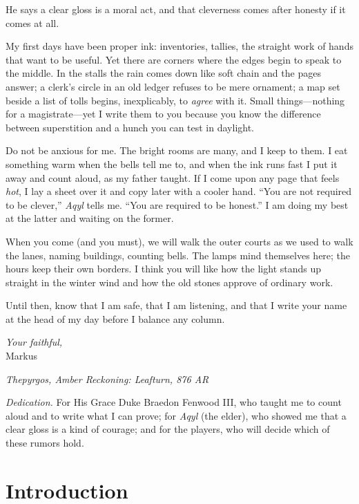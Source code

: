 \documentclass[11pt]{article}
\numberwithin{equation}{section} %
\theoremstyle{plain} %
\theoremstyle{definition} %
\theoremstyle{remark} %
\begin{document}
He says a clear gloss is a moral act, and that cleverness comes after honesty if it comes at all.

\medskip
My first days have been proper ink: inventories, tallies, the straight work of hands that want to be useful. Yet there are corners where the edges begin to speak to the middle. In the stalls the rain comes down like soft chain and the pages answer; a clerk’s circle in an old ledger refuses to be mere ornament; a map set beside a list of tolls begins, inexplicably, to \emph{agree} with it. Small things—nothing for a magistrate—yet I write them to you because you know the difference between superstition and a hunch you can test in daylight.

Do not be anxious for me. The bright rooms are many, and I keep to them. I eat something warm when the bells tell me to, and when the ink runs fast I put it away and count aloud, as my father taught. If I come upon any page that feels \emph{hot}, I lay a sheet over it and copy later with a cooler hand. “You are not required to be clever,” \textit{Aqyl} tells me. “You are required to be honest.” I am doing my best at the latter and waiting on the former.

\medskip
When you come (and you must), we will walk the outer courts as we used to walk the lanes, naming buildings, counting bells. The lamps mind themselves here; the hours keep their own borders. I think you will like how the light stands up straight in the winter wind and how the old stones approve of ordinary work.

Until then, know that I am safe, that I am listening, and that I write your name at the head of my day before I balance any column.

\medskip
\noindent\textit{Your faithful,}\\
Markus

\begin{flushright}
\textit{Thepyrgos, Amber Reckoning: Leafturn, 876 AR}
\end{flushright}

\medskip
\noindent\textit{Dedication.} For His Grace Duke Braedon Fenwood III, who taught me to count aloud and to write what I can prove; for \textit{Aqyl} (the elder), who showed me that a clear gloss is a kind of courage; and for the players, who will decide which of these rumors hold.

\clearpage

\section{Introduction}
\label{sec:introduction}
\end{document}
